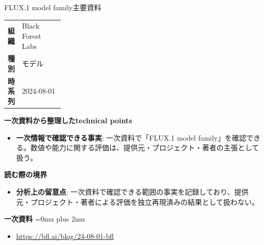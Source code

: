 \begin{technicalnote}{FLUX.1 model family}{主要資料}
\begingroup
\begin{tabularx}{\linewidth}{@{}>{\bfseries}p{0.22\linewidth}X@{}}
組織 & Black Forest Labs \\
種別 & モデル \\
時系列 & 2024-08-01 \\
\end{tabularx}
\smallskip
{\bfseries 一次資料から整理したtechnical points}
\begin{itemize}[leftmargin=1.5em,itemsep=0.35em]
\item \textbf{一次情報で確認できる事実}: 一次資料で「FLUX.1 model family」を確認できる。数値や能力に関する評価は、提供元・プロジェクト・著者の主張として扱う。
\end{itemize}
\begin{minipage}{\linewidth}
{\bfseries 読む際の境界}
\begin{itemize}[leftmargin=1.5em,itemsep=0.35em]
\item \textbf{分析上の留意点}: 一次資料で確認できる範囲の事実を記録しており、提供元・プロジェクト・著者による評価を独立再現済みの結果として扱わない。
\end{itemize}
\begin{samepage}
{\bfseries 一次資料}
\begingroup\sloppy
\Urlmuskip=0mu plus 2mu\relax
\begin{itemize}[leftmargin=1.5em,itemsep=0.25em]
\item {\scriptsize\url{https://bfl.ai/blog/24-08-01-bfl}}
\end{itemize}
\endgroup
\end{samepage}
\end{minipage}
\endgroup
\end{technicalnote}
\medskip

